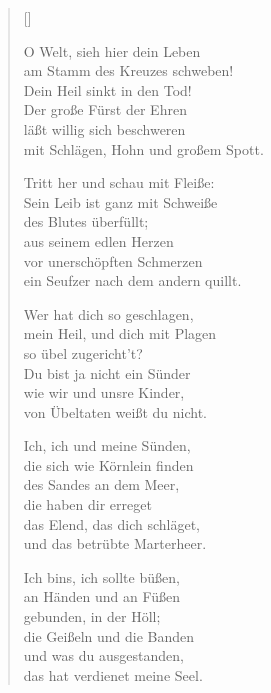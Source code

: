 \begin{multicols}{2}
\settowidth{\versewidth}{Tritt her und schau mit Fleiße:}
\begin{verse}[\versewidth]

 O Welt, sieh hier dein Leben\\
am Stamm des Kreuzes schweben!\\
Dein Heil sinkt in den Tod!\\
Der große Fürst der Ehren\\
läßt willig sich beschweren\\
mit Schlägen, Hohn und großem Spott.

 Tritt her und schau mit Fleiße:\\
Sein Leib ist ganz mit Schweiße\\
des Blutes überfüllt;\\
aus seinem edlen Herzen\\
vor unerschöpften Schmerzen\\
ein Seufzer nach dem andern quillt.

 Wer hat dich so geschlagen,\\
mein Heil, und dich mit Plagen\\
so übel zugericht't?\\
Du bist ja nicht ein Sünder\\
wie wir und unsre Kinder,\\
von Übeltaten weißt du nicht.

 Ich, ich und meine Sünden,\\
die sich wie Körnlein finden\\
des Sandes an dem Meer,\\
die haben dir erreget\\
das Elend, das dich schläget,\\
und das betrübte Marterheer.

 Ich bins, ich sollte büßen,\\
an Händen und an Füßen\\
gebunden, in der Höll;\\
die Geißeln und die Banden\\
und was du ausgestanden,\\
das hat verdienet meine Seel.


\end{verse}
\end{multicols}
